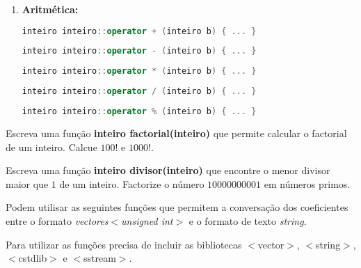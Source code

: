 \begin{enumerate}
\item \setlength{\leftskip}{4mm} {\bf Aritmética:}
\begin{lstlisting}[language=C++]
inteiro inteiro::operator + (inteiro b) { ... }
\end{lstlisting}
\begin{lstlisting}[language=C++]
inteiro inteiro::operator - (inteiro b) { ... }
\end{lstlisting}
\begin{lstlisting}[language=C++]
inteiro inteiro::operator * (inteiro b) { ... }
\end{lstlisting}
\begin{lstlisting}[language=C++]
inteiro inteiro::operator / (inteiro b) { ... }
\end{lstlisting}
\begin{lstlisting}[language=C++]
inteiro inteiro::operator % (inteiro b) { ... }
\end{lstlisting}
\end{enumerate}


\nextexer{} Escreva uma função {\bf inteiro factorial(inteiro)} que permite calcular o factorial de um inteiro. Calcue $100!$ e $1000!$.

\nextexer{} Escreva uma função {\bf inteiro divisor(inteiro)} que encontre o menor divisor maior que $1$ de um inteiro. Factorize o número $10000000001$ em números primos.
\newpage



Podem utilisar as seguintes funções que permitem a conversação dos coeficientes entre o formato {\it vectores$<$unsigned int$>$} e o formato de texto {\it string}.

Para utilizar as funções precisa de incluir as bibliotecas $<$vector$>$, $<$string$>$, $<$cstdlib$>$ e $<$sstream$>$.

